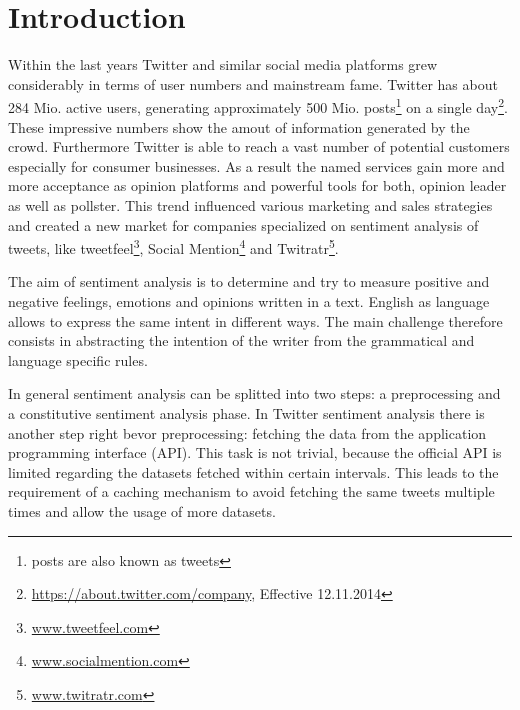 \section{Introduction}


Within the last years Twitter and similar social media platforms grew considerably in terms of user numbers and mainstream fame. Twitter has about 284 Mio. active users, generating approximately 500 Mio. posts\footnote{posts are also known as tweets} on a single day\footnote{\url{https://about.twitter.com/company}, Effective 12.11.2014}. These impressive numbers show the amout of information generated by the crowd. Furthermore Twitter is able to reach a vast number of potential customers especially for consumer businesses. As a result the named services gain more and more acceptance as opinion platforms and powerful tools for both, opinion leader as well as pollster. This trend influenced various marketing and sales strategies and created a new market for companies specialized on sentiment analysis of tweets, like tweetfeel\footnote{\url{www.tweetfeel.com}}, Social Mention\footnote{\url{www.socialmention.com}} and Twitratr\footnote{\url{www.twitratr.com}}.


The aim of sentiment analysis is to determine and try to measure positive and negative feelings, emotions and opinions written in a text. English as language allows to express the same intent in different ways. The main challenge therefore consists in abstracting the intention of the writer from the grammatical and language specific rules. 

In general sentiment analysis can be splitted into two steps: a preprocessing and a constitutive sentiment analysis phase. In Twitter sentiment analysis there is another step right bevor preprocessing: fetching the data from the application programming interface (API). This task is not trivial, because the official API is limited regarding the datasets fetched within certain intervals. This leads to the requirement of a caching mechanism to avoid fetching the same tweets multiple times and allow the usage of more datasets.



